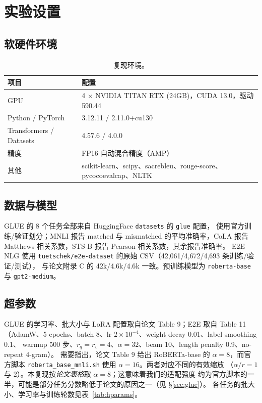 \documentclass[11pt,a4paper]{ctexart}
\begin{document}
\section{实验设置}

\subsection{软硬件环境}
\begin{table}[H]
\centering
\caption{复现环境。}
\label{tab:env}
\small
\begin{tabular}{ll}
\toprule
项目 & 配置 \\
\midrule
GPU & 4 $\times$ NVIDIA TITAN RTX (24GB)，CUDA 13.0，驱动 590.44 \\
Python / PyTorch & 3.12.11 / 2.11.0+cu130 \\
Transformers / Datasets & 4.57.6 / 4.0.0 \\
精度 & FP16 自动混合精度（AMP） \\
其他 & scikit-learn、scipy、sacrebleu、rouge-score、pycocoevalcap、NLTK \\
\bottomrule
\end{tabular}
\end{table}

\subsection{数据与模型}
GLUE 的 8 个任务全部来自 HuggingFace \texttt{datasets} 的 \texttt{glue} 配置，
使用官方训练/验证划分；MNLI 报告 matched 与 mismatched 的平均准确率，CoLA 报告
Matthews 相关系数，STS-B 报告 Pearson 相关系数，其余报告准确率。
E2E NLG 使用 \texttt{tuetschek/e2e-dataset} 的原始 CSV（42,061/4,672/4,693 条训练/验证/测试），
与论文附录 C 的 42k/4.6k/4.6k 一致。预训练模型为 \texttt{roberta-base} 与 \texttt{gpt2-medium}。

\subsection{超参数}
GLUE 的学习率、批大小与 LoRA 配置取自论文 Table 9；E2E 取自 Table 11
（AdamW、5 epochs、batch 8、lr $2\times10^{-4}$、weight decay 0.01、label smoothing 0.1、
warmup 500 步、$r_q=r_v=4$、$\alpha=32$、beam 10、length penalty 0.9、no-repeat 4-gram）。
需要指出，论文 Table 9 给出 RoBERTa-base 的 $\alpha=8$，而官方脚本
\texttt{roberta\_base\_mnli.sh} 使用 $\alpha=16$。两者对应不同的有效缩放
（$\alpha/r=1$ 与 $2$）。本复现按\emph{论文表格}取 $\alpha=8$；这意味着我们的适配强度
约为官方脚本的一半，可能是部分任务分数略低于论文的原因之一（见 \S\ref{sec:glue}）。
各任务的批大小、学习率与训练轮数见表~\ref{tab:hparams}。
\end{document}
